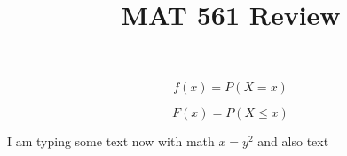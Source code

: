 \documentclass[11pt]{article}
\begin{document}
\title{MAT 561 Review} 
\date{} 
\maketitle	

\begin{equation}
f(x) = P(X=x) 
\end{equation}

\begin{equation}
F(x) = P(X\leq{x})
\end{equation}

I am typing some text now with math \(x = y^2\) and also text 
\end{document}

